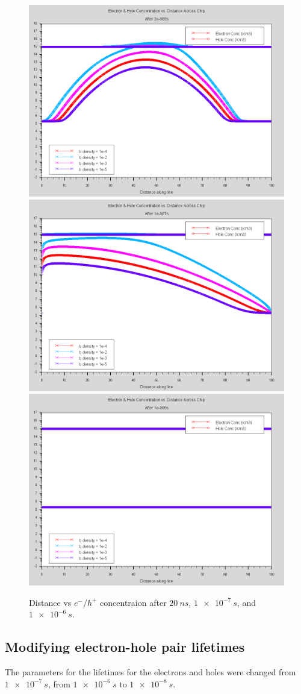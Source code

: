 \documentclass[12pt]{article}
\begin{document}
  \begin{figure}[htp]
    \centering
    \includegraphics[width=.3\textwidth]{density_after2e-008s}\hfill
    \includegraphics[width=.3\textwidth]{density_after1e-007s}\hfill
    \includegraphics[width=.3\textwidth]{density_after1e-006s}
    \caption{Distance vs $e^-$/$h^+$ concentraion after $\SI{20}{ns}$, $\SI{1e-7}{s}$, and $\SI{1e-6}{s}$.}
    \label{fig:distancevcurrent_density}
  \end{figure}

  \subsection{Modifying electron-hole pair lifetimes}

  The parameters for the lifetimes for the electrons and holes were changed from $\SI{1e-7}{s}$, from $\SI{1e-6}{s}$ to $\SI{1e-8}{s}$.
\end{document}
